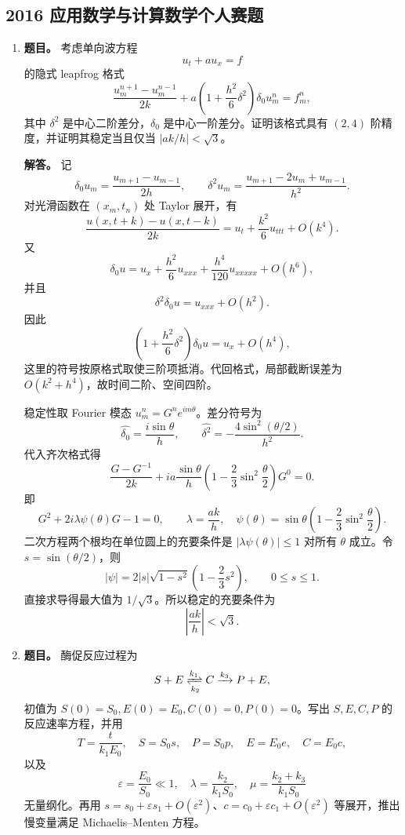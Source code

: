 ﻿\documentclass[UTF8,12pt]{ctexart}
\begin{document}
\subsection{2016 应用数学与计算数学个人赛题}
\begin{enumerate}[label=\textbf{\arabic*.},leftmargin=2.2em]
\item \textbf{题目。} 考虑单向波方程
\[
 u_t+a u_x=f
\]
的隐式 leapfrog 格式
\[
\frac{u_m^{n+1}-u_m^{n-1}}{2k}
+a\left(1+\frac{h^2}{6}\delta^2\right)\delta_0u_m^n=f_m^n,
\]
其中 \(\delta^2\) 是中心二阶差分，\(\delta_0\) 是中心一阶差分。证明该格式具有 \((2,4)\) 阶精度，并证明其稳定当且仅当 \(|ak/h|<\sqrt3\)。

\textbf{解答。} 记
\[
\delta_0u_m=\frac{u_{m+1}-u_{m-1}}{2h},\qquad
\delta^2u_m=\frac{u_{m+1}-2u_m+u_{m-1}}{h^2}.
\]
对光滑函数在 \((x_m,t_n)\) 处 Taylor 展开，有
\[
\frac{u(x,t+k)-u(x,t-k)}{2k}=u_t+\frac{k^2}{6}u_{ttt}+O(k^4).
\]
又
\[
\delta_0u=u_x+\frac{h^2}{6}u_{xxx}+\frac{h^4}{120}u_{xxxxx}+O(h^6),
\]
并且
\[
\delta^2\delta_0u=u_{xxx}+O(h^2).
\]
因此
\[
\left(1+\frac{h^2}{6}\delta^2\right)\delta_0u
=u_x+O(h^4),
\]
这里的符号按原格式取使三阶项抵消。代回格式，局部截断误差为 \(O(k^2+h^4)\)，故时间二阶、空间四阶。

稳定性取 Fourier 模态 \(u_m^n=G^ne^{im\theta}\)。差分符号为
\[
\widehat{\delta_0}=\frac{i\sin\theta}{h},\qquad
\widehat{\delta^2}=-\frac{4\sin^2(\theta/2)}{h^2}.
\]
代入齐次格式得
\[
\frac{G-G^{-1}}{2k}+ia\frac{\sin\theta}{h}\left(1-\frac23\sin^2\frac\theta2\right)G^0=0.
\]
即
\[
G^2+2i\lambda\psi(\theta)G-1=0,
\qquad
\lambda=\frac{ak}{h},
\quad
\psi(\theta)=\sin\theta\left(1-\frac23\sin^2\frac\theta2\right).
\]
二次方程两个根均在单位圆上的充要条件是 \(|\lambda\psi(\theta)|\le1\) 对所有 \(\theta\) 成立。令 \(s=\sin(\theta/2)\)，则
\[
|\psi|=2|s|\sqrt{1-s^2}\left(1-\frac23s^2\right),\qquad 0\le s\le1.
\]
直接求导得最大值为 \(1/\sqrt3\)。所以稳定的充要条件为
\[
\left|\frac{ak}{h}\right|<\sqrt3.
\]

\item \textbf{题目。} 酶促反应过程为
\[
S+E \xrightleftharpoons[k_2]{k_1} C \xrightarrow{k_3} P+E,
\]
初值为 \(S(0)=S_0,E(0)=E_0,C(0)=0,P(0)=0\)。写出 \(S,E,C,P\) 的反应速率方程，并用
\[
T=\frac{t}{k_1E_0},\quad S=S_0s,
\quad P=S_0p,
\quad E=E_0e,
\quad C=E_0c,
\]
以及
\[
\varepsilon=\frac{E_0}{S_0}\ll1,
\quad \lambda=\frac{k_2}{k_1S_0},
\quad \mu=\frac{k_2+k_3}{k_1S_0}
\]
无量纲化。再用 \(s=s_0+\varepsilon s_1+O(\varepsilon^2)\)、\(c=c_0+\varepsilon c_1+O(\varepsilon^2)\) 等展开，推出慢变量满足 Michaelis--Menten 方程。


\end{enumerate}
\end{document}
